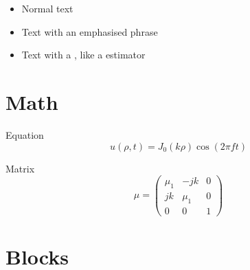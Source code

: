 \documentclass[aspectratio=169]{beamer}
\begin{document}
\begin{frame}{\secname}
  \begin{itemize}
    \item Normal text
    \item Text with an \alert{emphasised phrase}
    \item Text with a , like a  estimator
  \end{itemize}
\end{frame}

 \section{Math}
 \begin{frame}{\secname}{Equation}
   \centering
   \Huge
   $$
   u(\rho,t) = J_0(k\rho) \cos(2\pi f t)
   $$
 \end{frame}

 \begin{frame}{\secname}{Matrix}
   \centering
   \Huge
   $$
   \mu = \left(
     \begin{array}{ccc}
       \mu_{1} & -jk & 0 \\
       jk & \mu_{1} & 0 \\
       0 & 0 & 1
     \end{array}
   \right)
   $$
 \end{frame}

 \section{Blocks}
 \begin{frame}{\secname}
 \end{frame}
\end{document}
